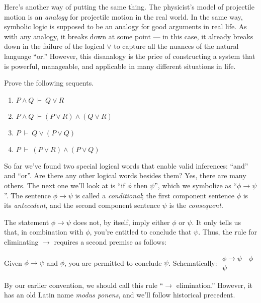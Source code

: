 Here's another way of putting the same thing.  The physicist's model
of projectile motion is an \textit{analogy} for projectile motion in
the real world.  In the same way, symbolic logic is supposed to be an
analogy for good arguments in real life.  As with any analogy, it
breaks down at some point --- in this case, it already breaks down in
the failure of the logical $\vee$ to capture all the nuances of the
natural language ``or.''  However, this disanalogy is the price of
constructing a system that is powerful, manageable, and applicable in
many different situations in life.

\begin{exercises} Prove the following sequents.
  \begin{enumerate}
  \item $P\wedge Q\:\vdash\:Q\vee R$
  \item $P\wedge Q\:\vdash (P\vee R)\wedge (Q\vee R)$  
  \item $P\:\vdash\:Q\vee (P\vee Q)$
  \item $P\:\vdash\: (P\vee R)\wedge (P\vee Q)$
  \end{enumerate}
\end{exercises}

So far we've found two special logical words that enable valid
inferences: ``and'' and ``or''.  Are there any other logical words
besides them?  Yes, there are many others.  The next one we'll look at
is ``if $\phi$ then $\psi$'', which we symbolize as ``$\phi\to\psi$''.
The sentence $\phi\to\psi$ is called a \emph{\gls{conditional}}; the
first component sentence $\phi$ is its \emph{\gls{antecedent}}, and
the second component sentence $\psi$ is the \emph{\gls{consequent}}.

The statement $\phi\to\psi$ does not, by itself, imply either $\phi$
or $\psi$.  It only tells us that, in combination with $\phi$, you're
entitled to conclude that $\psi$.  Thus, the rule for eliminating
$\to$ requires a second premise as follows:
\bigskip 
\begin{tcolorbox}[enhanced,width=10cm,title=modus ponens (MP),attach boxed title to top
  left={yshift=-2mm,xshift=4mm},boxed title style={sharp corners}]
Given \mbox{$\phi\to\psi$} and $\phi$, you are permitted to conclude $\psi$.
Schematically: $\begin{array}{c} \phi\to \psi \quad \phi \\ \hline
    \psi \end{array}$ \end{tcolorbox} \bigskip By our earlier
convention, we should call this rule ``$\to$ elimination.'' However,
it has an old Latin name \emph{modus ponens}, and we'll follow
historical precedent.
 
